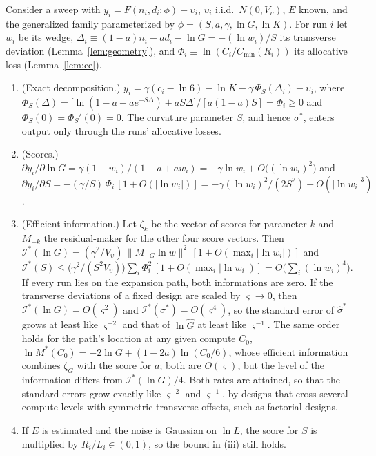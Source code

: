 \begin{proposition}\label{prop:A-info}
Consider a sweep with $y_i=F(n_i,d_i;\phi)-\upsilon_i$, $\upsilon_i$ i.i.d.\ $N(0,V_\upsilon)$, $E$ known, and the generalized
family parameterized by $\phi=(S,a,\gamma,\ln G,\ln K)$. For run $i$ let $w_i$ be its wedge,
$\Delta_i\equiv(1-a)n_i-ad_i-\ln G=-(\ln w_i)/S$ its transverse deviation (Lemma~\ref{lem:geometry}), and
$\Phi_i\equiv\ln(C_i/C_{\min}(R_i))$ its allocative loss (Lemma~\ref{lem:ce}).
\begin{enumerate}
\item[(i)] (Exact decomposition.) $y_i=\gamma(c_i-\ln6)-\ln K-\gamma\,\Phi_S(\Delta_i)-\upsilon_i$, where
$\Phi_S(\Delta)=\big[\ln(1-a+ae^{-S\Delta})+aS\Delta\big]/[a(1-a)S]=\Phi_i\ge0$ and $\Phi_S(0)=\Phi_S'(0)=0$. The curvature
parameter $S$, and hence $\sigma^*$, enters output only through the runs' allocative losses.
\item[(ii)] (Scores.) $\partial y_i/\partial\ln G=\gamma(1-w_i)/(1-a+aw_i)=-\gamma\ln w_i+O\big((\ln w_i)^2\big)$ and
$\partial y_i/\partial S=-(\gamma/S)\,\Phi_i\,[1+O(|\ln w_i|)]=-\gamma(\ln w_i)^2/(2S^2)+O(|\ln w_i|^3)$.
\item[(iii)] (Efficient information.) Let $\zeta_k$ be the vector of scores for parameter $k$ and $M_{-k}$ the
residual-maker for the other four score vectors. Then $\mathcal I^*(\ln G)=(\gamma^2/V_\upsilon)\,\|M_{-G}\ln w\|^2\,
[1+O(\max_i|\ln w_i|)]$ and $\mathcal I^*(S)\le\big(\gamma^2/(S^2V_\upsilon)\big)\sum_i\Phi_i^2\,[1+O(\max_i|\ln w_i|)]
=O\big(\sum_i(\ln w_i)^4\big)$. If every run lies on the expansion path, both informations are zero. If the transverse
deviations of a fixed design are scaled by $\varsigma\to0$, then $\mathcal I^*(\ln G)=O(\varsigma^2)$ and
$\mathcal I^*(\sigma^*)=O(\varsigma^4)$, so the standard error of $\hat\sigma^*$ grows at least like $\varsigma^{-2}$ and
that of $\ln\hat G$ at least like $\varsigma^{-1}$. The same order holds for the path's location at any given compute
$C_0$, $\ln M^*(C_0)=-2\ln G+(1-2a)\ln(C_0/6)$, whose efficient information combines $\zeta_G$ with the score for $a$;
both are $O(\varsigma)$, but the level of the information differs from $\mathcal I^*(\ln G)/4$. Both rates are attained,
so that the standard errors grow exactly like $\varsigma^{-2}$ and $\varsigma^{-1}$, by designs that cross several compute
levels with symmetric transverse offsets, such as factorial designs.
\item[(iv)] If $E$ is estimated and the noise is Gaussian on $\ln L$, the score for $S$ is multiplied by
$R_i/L_i\in(0,1)$, so the bound in (iii) still holds.
\end{enumerate}
\end{proposition}

